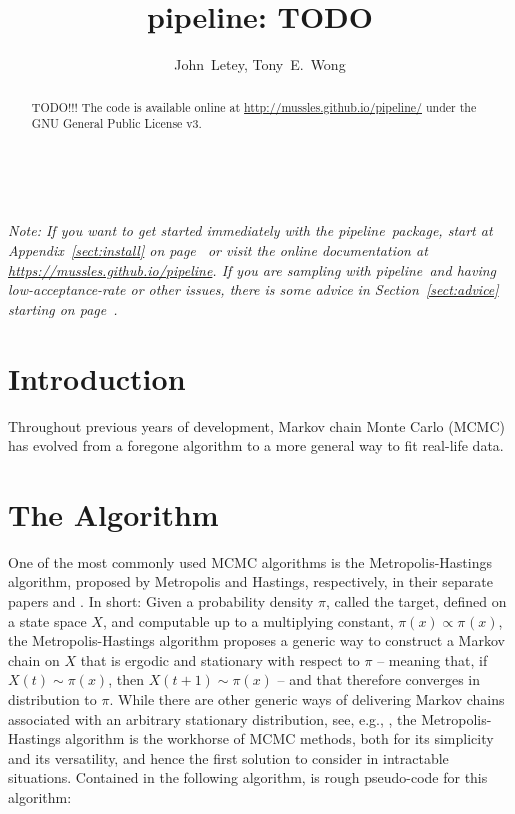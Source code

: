 \documentclass[12pt,preprint]{aastex}
\newcommand{\project}[1]{{\sffamily #1}}
\newcommand{\thisplain}{pipeline}
\newcommand{\this}{\project{\thisplain}}
\newcommand{\license}{GNU General Public License v3}
\newcommand{\Sect}[1]{Section~\ref{sect:#1}}
\newcommand{\sect}[1]{\Sect{#1}}
\newcommand{\App}[1]{Appendix~\ref{sect:#1}}
\newcommand{\app}[1]{\App{#1}}
\newcommand{\sectlabel}[1]{\label{sect:#1}}
\begin{document}
\title{\this: TODO}

\newcommand{\cu}{1}
\author{John~Letey\altaffilmark{\cu},
    Tony~E.~Wong\altaffilmark{\cu}}
\altaffiltext{\cu}{University of Colorado at Boulder}

\begin{abstract}
    TODO!!!  The code is available online
    at \url{http://mussles.github.io/\thisplain/} under the \license.
\end{abstract}


~\clearpage

\noindent
\emph{Note: If you want to get started immediately with the \this\ package,
  start at \app{install} on
  page~\pageref{sect:install} or visit the online documentation at
  \url{https://mussles.github.io/pipeline}. If you are sampling with \this\ and having
  low-acceptance-rate or other issues, there is some advice in
  \sect{advice} starting on page~\pageref{sect:advice}.}

\section{Introduction}

Throughout previous years of development, Markov chain Monte Carlo (MCMC) has evolved from a foregone algorithm to a more general way to fit real-life data.

\section{The Algorithm}\sectlabel{algo}

One of the most commonly used MCMC algorithms is the Metropolis-Hastings algorithm, proposed by Metropolis and Hastings, respectively, in their separate papers \cite{metropolis1953} and \cite{hastings1970}. In short: Given a probability density $\pi$, called the target, defined on a state space $X$, and computable up to a multiplying constant, $\pi(x) \propto \pi^{}(x)$, the Metropolis-Hastings algorithm proposes a generic way to construct a Markov chain on $X$ that is ergodic and stationary with respect to $\pi$ -- meaning that, if $X(t) \sim \pi(x)$, then $X(t+1) \sim \pi(x)$ -- and that therefore converges in distribution to $\pi$. While there are other generic ways of delivering Markov chains associated with an arbitrary stationary distribution, see, e.g., \cite{barker1965}, the Metropolis-Hastings algorithm is the workhorse of MCMC methods, both for its simplicity and its versatility, and hence the first solution to consider in intractable situations. Contained in the following algorithm, is rough pseudo-code for this algorithm:
\end{document}
